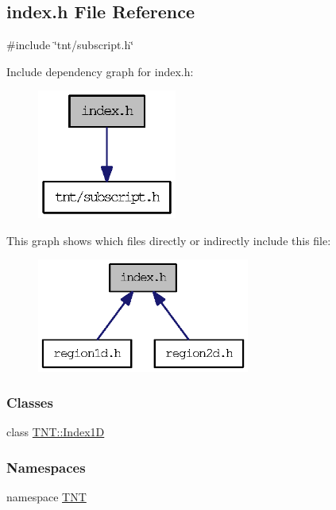 \subsection{index.h File Reference}
\label{index_8h}
{\ttfamily \#include \char`\"{}tnt/subscript.h\char`\"{}}\par
Include dependency graph for index.h:
\nopagebreak
\begin{figure}[H]
\begin{center}
\leavevmode
\includegraphics[width=130pt]{index_8h__incl}
\end{center}
\end{figure}
This graph shows which files directly or indirectly include this file:
\nopagebreak
\begin{figure}[H]
\begin{center}
\leavevmode
\includegraphics[width=198pt]{index_8h__dep__incl}
\end{center}
\end{figure}
\subsubsection*{Classes}
\begin{DoxyCompactItemize}
\item 
class \hyperlink{class_t_n_t_1_1_index1_d}{TNT::Index1D}
\end{DoxyCompactItemize}
\subsubsection*{Namespaces}
\begin{DoxyCompactItemize}
\item 
namespace \hyperlink{namespace_t_n_t}{TNT}
\end{DoxyCompactItemize}

